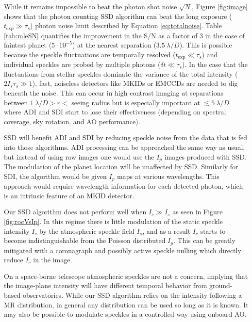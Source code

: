\documentclass[../main.tex]{subfiles}
\begin{document}
While it remains impossible to beat the photon shot noise $\sqrt{N}$, Figure \ref{fig:image} shows that the photon counting SSD algorithm can beat the long exposure ($t_\mathrm{exp} \gg \tau_s$) photon noise limit described by Equation \eqref{eq:totalnoise}. Table \ref{tab:mleSN} quantifies the improvement in the S/N as a factor of 3 in the case of faintest planet ($5\cdot 10^{-5}$) at the nearest separation ($3.5~\lambda/D$). This is possible because the speckle fluctuations are temporally resolved ($t_\mathrm{exp} \ll \tau_s$) and individual speckles are probed by multiple photons ($\delta t \ll \tau_s$). In the case that the fluctuations from stellar speckles dominate the variance of the total intensity ($2 I_s \tau_s \gg 1$), fast, noiseless detectors like MKIDs or EMCCDs are needed to dig beneath the noise. This can occur in high contrast imaging at separations between $1~\lambda/D > r <$ seeing radius but is especially important at $\lesssim 5~\lambda/D$ where ADI and SDI start to lose their effectiveness (depending on spectral coverage, sky rotation, and AO performance).

SSD will benefit ADI and SDI by reducing speckle noise from the data that is fed into those algorithms. ADI processing can be approached the same way as usual, but instead of using raw images one would use the $I_p$ images produced with SSD. The modulation of the planet location will be unaffected by SSD. Similarly for SDI, the algorithm would be given $I_p$ maps at various wavelengths. This approach would require wavelength information for each detected photon, which is an intrinsic feature of an MKID detector. 

Our SSD algorithm does not perform well when $I_c \gg I_s$ as seen in Figure \ref{fig:rocVsIp}. In this regime there is little modulation of the static speckle intensity $I_c$ by the atmospheric speckle field $I_s$, and as a result $I_c$ starts to become indistinguishable from the Poisson distributed $I_p$. This can be greatly mitigated with a coronagraph and possibly active speckle nulling \parencite{Martinache_2014} which directly reduce $I_c$ in the image. 

On a space-borne telescope atmospheric speckles are not a concern, implying that the image-plane intensity will have different temporal behavior from ground-based observatories. While our SSD algorithm relies on the intensity following a MR distribution, in general any distribution can be used so long as it is known. It may also be possible to modulate speckles in a controlled way using onboard AO. 
\end{document}

